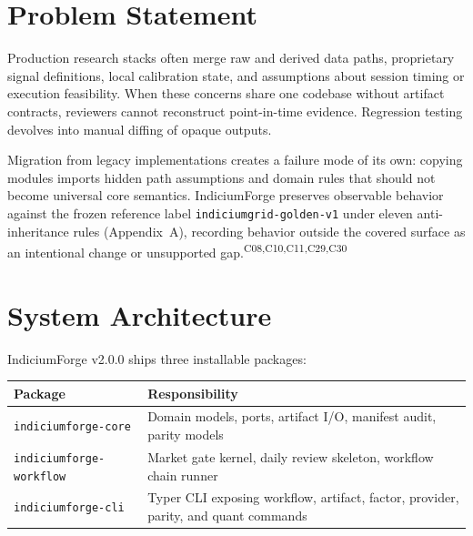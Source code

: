 \documentclass[11pt]{article}
\newcommand{\schema}[1]{\texttt{#1}}
\newcommand{\pkg}[1]{\texttt{#1}}
\newcommand{\claim}[1]{\textsuperscript{\textsf{#1}}}
\begin{document}
\section{Problem Statement}

Production research stacks often merge raw and derived data paths, proprietary signal
definitions, local calibration state, and assumptions about session timing or execution
feasibility. When these concerns share one codebase without artifact contracts, reviewers
cannot reconstruct point-in-time evidence. Regression testing devolves into manual diffing
of opaque outputs.

Migration from legacy implementations creates a failure mode of its own: copying modules imports
hidden path assumptions and domain rules that should not become universal core semantics.
IndiciumForge preserves observable behavior against the frozen reference label
\schema{indiciumgrid-golden-v1} under eleven anti-inheritance rules (Appendix~A), recording
behavior outside the covered surface as an intentional change or unsupported gap.\claim{C08,C10,C11,C29,C30}

\section{System Architecture}

IndiciumForge v2.0.0 ships three installable packages:
\begin{center}
\begin{tabular}{ll}
\toprule
Package & Responsibility \\
\midrule
\pkg{indiciumforge-core} & Domain models, ports, artifact I/O, manifest audit, parity models \\
\pkg{indiciumforge-workflow} & Market gate kernel, daily review skeleton, workflow chain runner \\
\pkg{indiciumforge-cli} & Typer CLI exposing workflow, artifact, factor, provider, parity, and quant commands \\
\bottomrule
\end{tabular}
\end{center}
\end{document}

